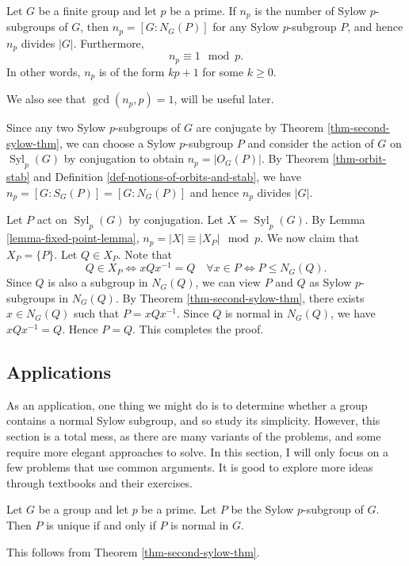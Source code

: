 \begin{theorem} \label{thm-third-sylow-thm}
	Let $G$ be a finite group and let $p$ be a prime. If $n_p$ is the number of Sylow $p$-subgroups of $G$, then $n_p = [G:N_G(P)]$ for any Sylow $p$-subgroup $P$, and hence  $n_p $ divides $|G|$. Furthermore, $$n_p \equiv 1 \mod p.$$ In other words, $n_p$ is of the form $kp+1$ for some $k\geq 0$.
\end{theorem}
\begin{remark}
	We also see that $\gcd(n_p, p) = 1$, will be useful later.
\end{remark}
\begin{sketch}
	Since any two Sylow $p$-subgroups of $G$ are conjugate by Theorem \ref{thm-second-sylow-thm}, we can choose a Sylow $p$-subgroup $P$ and consider the action of $G$ on $\operatorname{Syl}_p(G)$ by conjugation to obtain $n_p = |O_G(P)|$. By Theorem \ref{thm-orbit-stab} and  Definition  \ref{def-notions-of-orbits-and-stab}, we have $n_p = [G:S_G(P)] = [G:N_G(P)]$ and hence $n_p$ divides $|G|$.
	
	Let $P$ act on $\operatorname{Syl}_p(G)$ by conjugation. Let $X = \operatorname{Syl}_p(G)$. By Lemma \ref{lemma-fixed-point-lemma}, $n_p =|X| \equiv |X_P|\mod p$. We now claim that $X_P  =\{P\}$. Let $Q\in X_P$. Note that
	$$Q\in X_P\iff xQx^{-1} = Q \quad\forall x\in P \iff P\leq N_G(Q).$$
	Since $Q$ is also a subgroup in $N_G(Q)$, we can view $P$ and $Q$ as Sylow $p$-subgroups in $N_G(Q)$. By Theorem \ref{thm-second-sylow-thm}, there exists $x\in N_G(Q)$ such that $P = xQx^{-1}$. Since $Q$ is normal in $N_G(Q)$, we have $xQx^{-1}=Q$. Hence $P=Q$. This completes the proof.
\end{sketch}



\subsection{Applications}
As an application, one thing we might do is to determine whether a group contains a normal Sylow subgroup, and so study its simplicity. However, this section is a total mess, as there are many variants of the problems, and some require more elegant approaches to solve. In this section, I will only focus on a few problems that use common arguments. It is good to explore more ideas through textbooks and their exercises.
\begin{corollary} \label{cor-one-sylow-p-implies-normal}
	Let $G$ be a group and let $p$ be a prime. Let $P$ be the Sylow $p$-subgroup of $G$. Then  $P$ is unique if and only if $P$ is normal in $G$.
\end{corollary}
\begin{sketch}
	This follows from Theorem \ref{thm-second-sylow-thm}.
\end{sketch}

